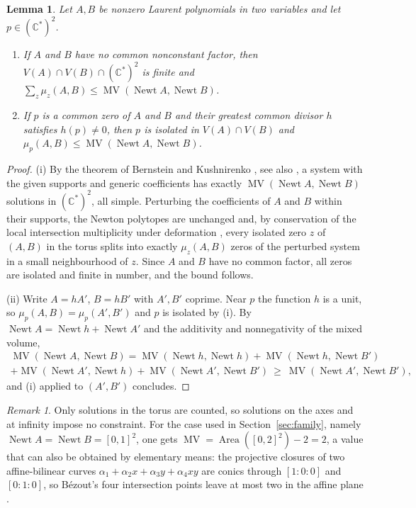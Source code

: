 \documentclass[12pt]{article}
\theoremstyle{plain}
\newtheorem{lemma}[theorem]{Lemma}
\theoremstyle{definition}
\theoremstyle{remark}
\newtheorem{remark}[theorem]{Remark}
\newcommand{\C}{\mathbb{C}}
\DeclareMathOperator{\MV}{MV}
\DeclareMathOperator{\Newt}{Newt}
\begin{document}
	\begin{lemma}\label{lem:BKK}
		Let $A,B$ be nonzero Laurent polynomials in two variables and let
		$p\in(\C^{*})^{2}$.
		\begin{enumerate}[label=\rm(\roman*)]
			\item If $A$ and $B$ have no common nonconstant factor, then
			$V(A)\cap V(B)\cap(\C^{*})^{2}$ is finite and
			$\sum_{z}\mu_{z}(A,B)\le\MV(\Newt A,\Newt B)$.
			\item If $p$ is a common zero of $A$ and $B$ and their greatest common
			divisor $h$ satisfies $h(p)\neq0$, then $p$ is isolated in
			$V(A)\cap V(B)$ and $\mu_{p}(A,B)\le\MV(\Newt A,\Newt B)$.
		\end{enumerate}
	\end{lemma}
	
	\begin{proof}
		(i) By the theorem of Bernstein and Kushnirenko
		\cite{Bernstein1975,Kushnirenko1976}, see also \cite[Sect.~7.5]{CLO}, a
		system with the given supports and generic coefficients has exactly
		$\MV(\Newt A,\Newt B)$ solutions in $(\C^{*})^{2}$, all simple.
		Perturbing the coefficients of $A$ and $B$ within their supports, the
		Newton polytopes are unchanged and, by conservation of the local
		intersection multiplicity under deformation
		\cite[Ch.~12]{Fulton1998}, every isolated zero $z$ of $(A,B)$ in the
		torus splits into
		exactly $\mu_{z}(A,B)$ zeros of the perturbed system in a small
		neighbourhood of $z$.  Since $A$ and $B$ have no common factor, all
		zeros are isolated and finite in number, and the bound follows.
		
		(ii) Write $A=hA'$, $B=hB'$ with $A',B'$ coprime.  Near $p$ the
		function $h$ is a unit, so $\mu_{p}(A,B)=\mu_{p}(A',B')$ and $p$ is
		isolated by (i).  By $\Newt A=\Newt h+\Newt A'$ and the additivity and
		nonnegativity of the mixed volume,
		\begin{multline*}
			\MV(\Newt A,\Newt B)
			=\MV(\Newt h,\Newt h)+\MV(\Newt h,\Newt B')\\
			+\MV(\Newt A',\Newt h)+\MV(\Newt A',\Newt B')
			\ \geq\ \MV(\Newt A',\Newt B') ,
		\end{multline*}
		and (i) applied to $(A',B')$ concludes.
	\end{proof}
	
	\begin{remark}\label{rem:square}
		Only solutions in the torus are counted, so solutions on the axes and
		at infinity impose no constraint.  For the case used in
		Section~\ref{sec:family}, namely $\Newt A=\Newt B=[0,1]^{2}$, one gets
		$\MV=\operatorname{Area}([0,2]^{2})-2=2$, a value that can also be
		obtained by elementary means: the projective closures of two
		affine-bilinear curves $\alpha_{1}+\alpha_{2}x+\alpha_{3}y+\alpha_{4}xy$
		are conics through $[1:0:0]$ and $[0:1:0]$, so B\'ezout's four
		intersection points leave at most two in the affine plane
		\cite[Ch.~5]{Fulton}.
	\end{remark}
	
\end{document}
